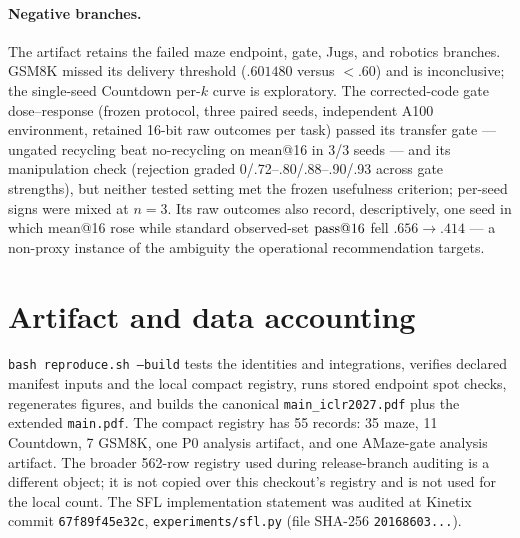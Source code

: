 \paragraph{Negative branches.}
The artifact retains the failed maze endpoint, gate, Jugs, and robotics
branches. GSM8K missed its delivery threshold ($.601480$ versus $<.60$) and
is inconclusive; the single-seed Countdown per-$k$ curve is exploratory.
The corrected-code gate dose--response (frozen protocol, three paired seeds,
independent A100 environment, retained 16-bit raw outcomes per task) passed
its transfer gate --- ungated recycling beat no-recycling on mean@16 in 3/3
seeds --- and its manipulation check (rejection graded 0/.72--.80/.88--.90/.93
across gate strengths), but neither tested setting met the frozen usefulness
criterion; per-seed signs were mixed at $n=3$. Its raw outcomes also record,
descriptively, one seed in which mean@16 rose while standard observed-set
$\text{pass@}16$ fell $.656\to.414$ --- a non-proxy instance of the ambiguity
the operational recommendation targets.

\section{Artifact and data accounting}
\label{app:artifact}

\texttt{bash reproduce.sh --build} tests the identities and integrations,
verifies declared manifest inputs and the local compact registry, runs stored
endpoint spot checks, regenerates figures, and builds the canonical
\texttt{main\_iclr2027.pdf} plus the extended \texttt{main.pdf}. The compact
registry has 55 records: 35 maze, 11 Countdown, 7 GSM8K, one P0 analysis
artifact, and one AMaze-gate analysis artifact. The broader
562-row registry used during release-branch auditing is a different object; it
is not copied over this checkout's registry and is not used for the local
count. The SFL implementation statement was audited at Kinetix commit
\texttt{67f89f45e32c}, \texttt{experiments/sfl.py} (file SHA-256
\texttt{20168603...}).

